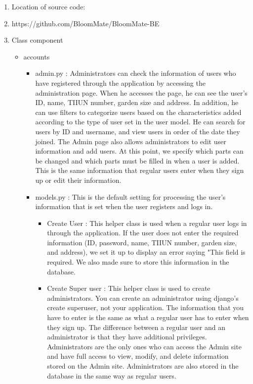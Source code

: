 \documentclass[conference, a4paper]{IEEEtran}
\begin{document}
\begin{enumerate}
    \item Location of source code:
    \item[] https://github.com/BloomMate/BloomMate-BE\\
    \item Class component
    \begin{itemize}
        \item accounts
        \begin{itemize}
            \item admin.py : Administrators can check the information of users who have registered through the application by accessing the administration page. When he accesses the page, he can see the user's ID, name, TIIUN number, garden size and address. In addition, he can use filters to categorize users based on the characteristics added according to the type of user set in the user model. He can search for users by ID and username, and view users in order of the date they joined. The Admin page also allows administrators to edit user information and add users. At this point, we specify which parts can be changed and which parts must be filled in when a user is added. This is the same information that regular users enter when they sign up or edit their information. \\
            \item models.py : This is the default setting for processing the user's information that is set when the user registers and logs in. \\
            \begin{itemize}
                \item Create User : This helper class is used when a regular user logs in through the application. If the user does not enter the required information (ID, password, name, TIIUN number, garden size, and address), we set it up to display an error saying "This field is required. We also made sure to store this information in the database. 
                \item Create Super user : This helper class is used to create administrators. You can create an administrator using django's create superuser, not your application. The information that you have to enter is the same as what a regular user has to enter when they sign up. The difference between a regular user and an administrator is that they have additional privileges. Administrators are the only ones who can access the Admin site and have full access to view, modify, and delete information stored on the Admin site. Administrators are also stored in the database in the same way as regular users.

\end{itemize}
\end{itemize}
\end{itemize}
\end{enumerate}
\end{document}
